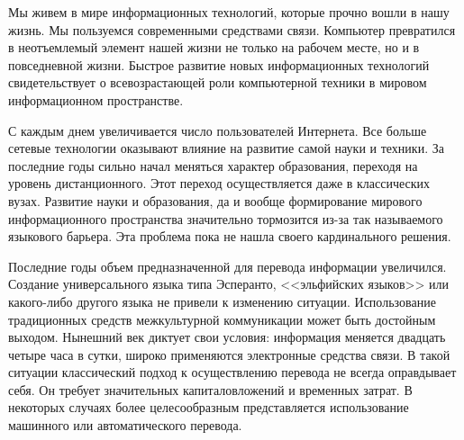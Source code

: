 	
	Мы живем в мире информационных технологий, которые прочно вошли 
	в нашу жизнь. Мы пользуемся современными средствами связи. 
	Компьютер превратился в неотъемлемый элемент нашей жизни не только 
	на рабочем месте, но и в повседневной жизни. Быстрое развитие новых 
	информационных технологий свидетельствует о всевозрастающей роли 
	компьютерной техники в мировом информационном пространстве. 
	
	С каждым днем увеличивается число пользователей Интернета. Все 
	больше сетевые технологии оказывают влияние на развитие самой науки 
	и техники. За последние годы сильно начал меняться характер 
	образования, переходя на уровень дистанционного. Этот переход 
	осуществляется даже в классических вузах. Развитие науки и образования, 
	да и вообще формирование мирового информационного пространства 
	значительно тормозится из-за так называемого языкового барьера. 
	Эта проблема пока не нашла своего кардинального решения. 
	
	Последние годы объем предназначенной для перевода информации 
	увеличился. Создание универсального языка типа Эсперанто, <<эльфийских 
	языков>> или какого-либо другого языка не привели к изменению ситуации. 
	Использование традиционных средств межкультурной коммуникации 
	может быть достойным выходом. Нынешний век диктует свои условия: 
	информация меняется двадцать четыре часа в сутки, широко применяются 
	электронные средства связи. В такой ситуации классический подход 
	к осуществлению перевода не всегда оправдывает себя. Он требует 
	значительных капиталовложений и временных затрат. В некоторых 
	случаях более целесообразным представляется использование машинного 
	или автоматического перевода. 
